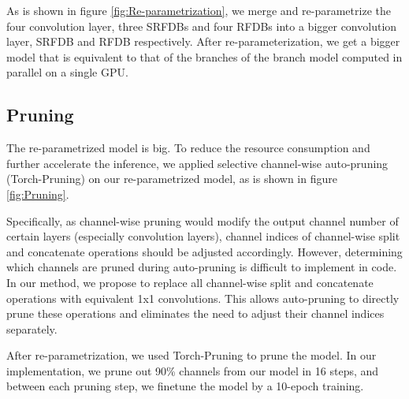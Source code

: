 \documentclass[10pt,twocolumn,letterpaper]{article}
\begin{document}
As is shown in figure \ref{fig:Re-parametrization}, we merge and re-parametrize the four convolution layer, three SRFDBs and four RFDBs into a bigger convolution layer, SRFDB and RFDB respectively. 
After re-parameterization, we get a bigger model that is equivalent to that of the branches of the branch model computed in parallel on a single GPU.

\subsection{Pruning}
The re-parametrized model is big. To reduce the resource consumption and further accelerate the inference, we applied selective channel-wise auto-pruning (Torch-Pruning\cite{fang2023depgraph}) on our re-parametrized model, as is shown in figure \ref{fig:Pruning}. 

Specifically, as channel-wise pruning would modify the output channel number of certain layers (especially convolution layers), channel indices of channel-wise split and concatenate operations should be adjusted accordingly.
However, determining which channels are pruned during auto-pruning is difficult to implement in code.
In our method, we propose to replace all channel-wise split and concatenate operations with equivalent 1x1 convolutions.
This allows auto-pruning to directly prune these operations and eliminates the need to adjust their channel indices separately.

After re-parametrization, we used Torch-Pruning to prune the model.
In our implementation, we prune out 90\% channels from our model in 16 steps, and between each pruning step, we finetune the model by a 10-epoch training.
\end{document}
